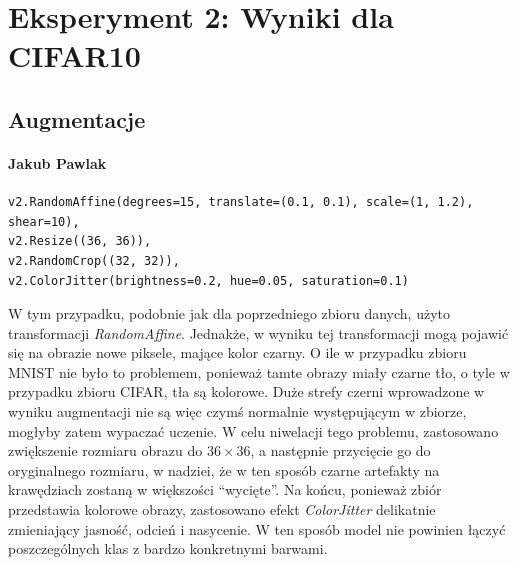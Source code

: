 \documentclass[10pt]{article}
\begin{document}
\pagebreak
\section{Eksperyment 2: Wyniki dla CIFAR10}\label{sec:ex2_cifar}

\subsection*{Augmentacje}

\begin{multicols}{2}
    \paragraph{Jakub Pawlak}
    \scriptsize
    \begin{verbatim}
v2.RandomAffine(degrees=15, translate=(0.1, 0.1), scale=(1, 1.2), shear=10),
v2.Resize((36, 36)),
v2.RandomCrop((32, 32)),
v2.ColorJitter(brightness=0.2, hue=0.05, saturation=0.1)
    \end{verbatim}
    \normalsize
    W tym przypadku, podobnie jak dla poprzedniego zbioru danych, użyto transformacji \emph{RandomAffine}.
    Jednakże, w wyniku tej transformacji mogą pojawić się na obrazie nowe piksele, mające kolor czarny.
    O ile w przypadku zbioru MNIST nie było to problemem, ponieważ tamte obrazy miały czarne tło, o tyle w przypadku zbioru CIFAR, tła są kolorowe.
    Duże strefy czerni wprowadzone w wyniku augmentacji nie są więc czymś normalnie występującym w zbiorze, mogłyby zatem wypaczać uczenie.
    W celu niwelacji tego problemu, zastosowano zwiększenie rozmiaru obrazu do $36\times36$, a następnie przycięcie go do oryginalnego rozmiaru, w nadziei, że w ten sposób czarne artefakty na krawędziach zostaną w większości ``wycięte''.
    Na końcu, ponieważ zbiór przedstawia kolorowe obrazy, zastosowano efekt \emph{ColorJitter} delikatnie zmieniający jasność, odcień i nasycenie.
    W ten sposób model nie powinien łączyć poszczególnych klas z bardzo konkretnymi barwami.
    \newcolumn{}

\end{multicols}
\end{document}
